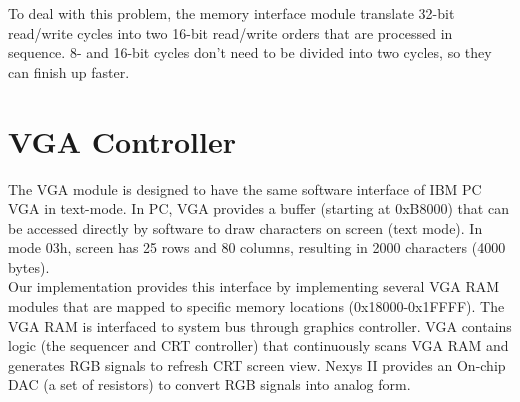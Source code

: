 \documentclass[]{scrartcl}
\begin{document}
To deal with this problem, the memory interface module translate 32-bit
read/write cycles into two 16-bit read/write orders that are processed
in sequence. 8- and 16-bit cycles don't need to be divided into two cycles,
so they can finish up faster.

\section{VGA Controller}

The VGA module is designed to have the same software interface of IBM PC VGA in
text-mode. In PC, VGA provides a buffer (starting at 0xB8000) that can be
accessed directly by software to draw characters on screen (text mode). In mode
03h, screen has 25 rows and 80 columns, resulting in 2000 characters (4000
bytes).\\

Our implementation provides this interface by implementing several VGA RAM
modules that are mapped to specific memory locations (0x18000-0x1FFFF). The
VGA RAM is interfaced to system bus through graphics controller. VGA contains
logic (the sequencer and CRT controller) that continuously scans VGA RAM and
generates RGB signals to refresh CRT screen view. Nexys II provides an On-chip
DAC (a set of resistors) to convert RGB signals into analog form.
\end{document}
